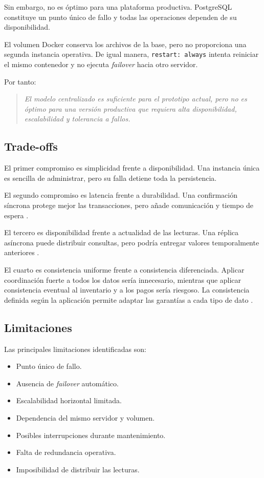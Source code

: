 \documentclass[11pt,a4paper]{article}
\begin{document}
Sin embargo, no es óptimo para una plataforma productiva. PostgreSQL constituye un punto único de fallo y todas las operaciones dependen de su disponibilidad.

El volumen Docker conserva los archivos de la base, pero no proporciona una segunda instancia operativa. De igual manera, \texttt{restart: always} intenta reiniciar el mismo contenedor y no ejecuta \textit{failover} hacia otro servidor.

Por tanto:

\begin{quote}
\textit{El modelo centralizado es suficiente para el prototipo actual, pero no es óptimo para una versión productiva que requiera alta disponibilidad, escalabilidad y tolerancia a fallos.}
\end{quote}

\subsection{Trade-offs}
El primer compromiso es simplicidad frente a disponibilidad. Una instancia única es sencilla de administrar, pero su falla detiene toda la persistencia.

El segundo compromiso es latencia frente a durabilidad. Una confirmación síncrona protege mejor las transacciones, pero añade comunicación y tiempo de espera \cite{abadi2012}.

El tercero es disponibilidad frente a actualidad de las lecturas. Una réplica asíncrona puede distribuir consultas, pero podría entregar valores temporalmente anteriores \cite{margara2023}.

El cuarto es consistencia uniforme frente a consistencia diferenciada. Aplicar coordinación fuerte a todos los datos sería innecesario, mientras que aplicar consistencia eventual al inventario y a los pagos sería riesgoso. La consistencia definida según la aplicación permite adaptar las garantías a cada tipo de dato \cite{li2022}.

\subsection{Limitaciones}
Las principales limitaciones identificadas son:

\begin{itemize}
    \item Punto único de fallo.
    \item Ausencia de \textit{failover} automático.
    \item Escalabilidad horizontal limitada.
    \item Dependencia del mismo servidor y volumen.
    \item Posibles interrupciones durante mantenimiento.
    \item Falta de redundancia operativa.
    \item Imposibilidad de distribuir las lecturas.
\end{itemize}
\end{document}
